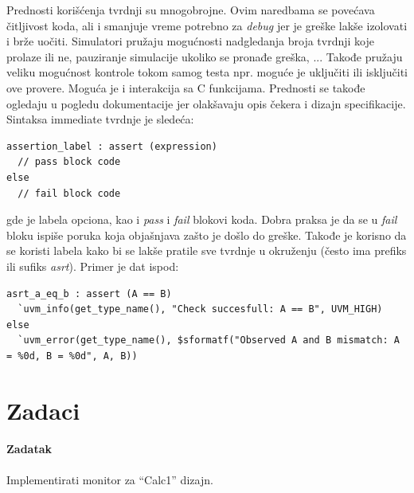 Prednosti korišćenja tvrdnji su mnogobrojne. Ovim naredbama se povećava
čitljivost koda, ali i smanjuje vreme potrebno za \emph{debug} jer je greške
lakše izolovati i brže uočiti. Simulatori pružaju mogućnosti nadgledanja broja
tvrdnji koje prolaze ili ne, pauziranje simulacije ukoliko se pronađe greška,
... Takođe pružaju veliku mogućnost kontrole tokom samog testa npr. moguće je
uključiti ili isključiti ove provere. Moguća je i interakcija sa C funkcijama.
Prednosti se takođe ogledaju u pogledu dokumentacije jer olakšavaju opis čekera
i dizajn specifikacije.\\

Sintaksa immediate tvrdnje je sledeća:

\begin{lstlisting}
assertion_label : assert (expression)
  // pass block code
else
  // fail block code
\end{lstlisting}

gde je labela opciona, kao i \emph{pass} i \emph{fail} blokovi koda. Dobra
praksa je da se u \emph{fail} bloku ispiše poruka koja objašnjava zašto je došlo
do greške. Takođe je korisno da se koristi labela kako bi se lakše pratile sve
tvrdnje u okruženju (često ima prefiks ili sufiks \emph{asrt}). Primer je dat
ispod:

\begin{lstlisting}
asrt_a_eq_b : assert (A == B)
  `uvm_info(get_type_name(), "Check succesfull: A == B", UVM_HIGH)
else
  `uvm_error(get_type_name(), $sformatf("Observed A and B mismatch: A = %0d, B = %0d", A, B))
\end{lstlisting}


\section{Zadaci}

\paragraph{Zadatak}

Implementirati monitor za ``Calc1'' dizajn.


